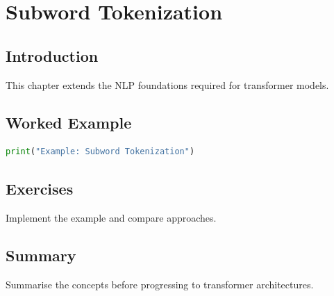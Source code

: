 \chapter{Subword Tokenization}
\label{chap:vol8-9}



\section{Introduction}
This chapter extends the NLP foundations required for transformer models.

\section{Worked Example}
\begin{lstlisting}[language=Python]
print("Example: Subword Tokenization")
\end{lstlisting}

\section{Exercises}
\begin{exercise}
Implement the example and compare approaches.
\end{exercise}

\section{Summary}
Summarise the concepts before progressing to transformer architectures.
